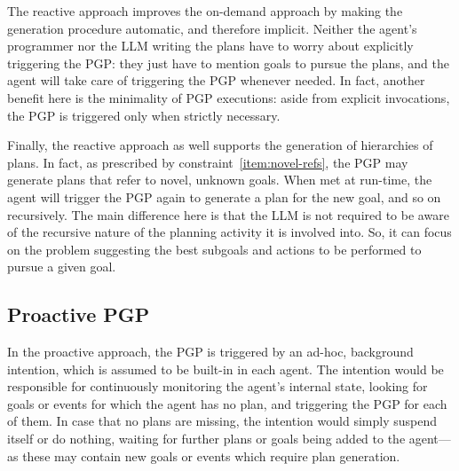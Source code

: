 \documentclass[12pt,a4paper,openright,twoside]{book}
\begin{document}
The reactive approach improves the on-demand approach by making the generation procedure automatic, and therefore implicit.
%
Neither the agent's programmer nor the \ac{LLM} writing the plans have to worry about explicitly triggering the \ac{PGP}: they just have to mention goals to pursue the plans, and the agent will take care of triggering the \ac{PGP} whenever needed.
%
In fact, another benefit here is the minimality of \ac{PGP} executions: aside from explicit invocations, the \ac{PGP} is triggered only when strictly necessary.

Finally, the reactive approach as well supports the generation of hierarchies of plans.
%
In fact, as prescribed by constraint~\ref{item:novel-refs}, the \ac{PGP} may generate plans that refer to novel, unknown goals.
%
When met at run-time, the agent will trigger the \ac{PGP} again to generate a plan for the new goal, and so on recursively.
%
The main difference here is that the \ac{LLM} is not required to be aware of the recursive nature of the planning activity it is involved into.
%
So, it can focus on the problem suggesting the best subgoals and actions to be performed to pursue a given goal.

\subsection{Proactive \acs{PGP}}

In the proactive approach, the \ac{PGP} is triggered by an ad-hoc, background intention, which is assumed to be built-in in each agent.
%
The intention would be responsible for continuously monitoring the agent's internal state, looking for goals or events for which the agent has no plan, and triggering the \ac{PGP} for each of them.
%
In case that no plans are missing, the intention would simply suspend itself or do nothing, waiting for further plans or goals being added to the agent---as these may contain new goals or events which require plan generation.
\end{document}
